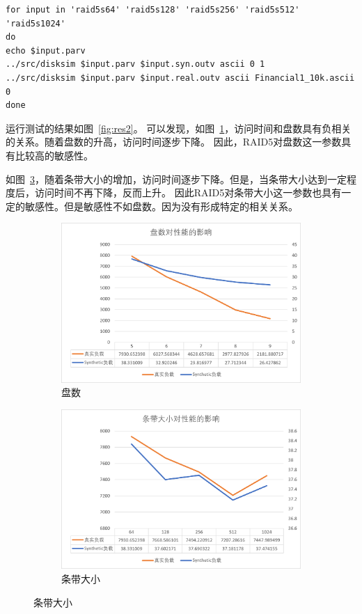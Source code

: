 \documentclass[a4paper,twoside]{article}
\begin{document}
\begin{spacing}{1.2}
\begin{listing}[htb]
\begin{verbatim}
for input in 'raid5s64' 'raid5s128' 'raid5s256' 'raid5s512' 'raid5s1024'
do
echo $input.parv
../src/disksim $input.parv $input.syn.outv ascii 0 1
../src/disksim $input.parv $input.real.outv ascii Financial1_10k.ascii 0
done
	\end{verbatim}
\end{listing}

运行测试的结果如图~\ref{fig:res2}。
可以发现，如图~\ref{fig:dcnt}，访问时间和盘数具有负相关的关系。随着盘数的升高，访问时间逐步下降。
因此，RAID5对盘数这一参数具有比较高的敏感性。

如图~\ref{fig:ssize}，随着条带大小的增加，访问时间逐步下降。但是，当条带大小达到一定程度后，访问时间不再下降，反而上升。
因此RAID5对条带大小这一参数也具有一定的敏感性。但是敏感性不如盘数。因为没有形成特定的相关关系。
\begin{figure}[ht]
	\centering
	\caption{参数敏感性的结果}
	\label{fig:synout}
	\begin{subfigure}{0.45\textwidth}
		\centering
		\caption{盘数}
		\label{fig:dcnt}
		\includegraphics[width=0.9\linewidth]{dcnt.png}
	\end{subfigure}
	\begin{subfigure}{0.45\textwidth}
		\centering
		\caption{条带大小}
		\label{fig:ssize}
		\includegraphics[width=0.9\linewidth]{ssize.png}
	\end{subfigure}
\end{figure}


\end{spacing}
\end{document}
